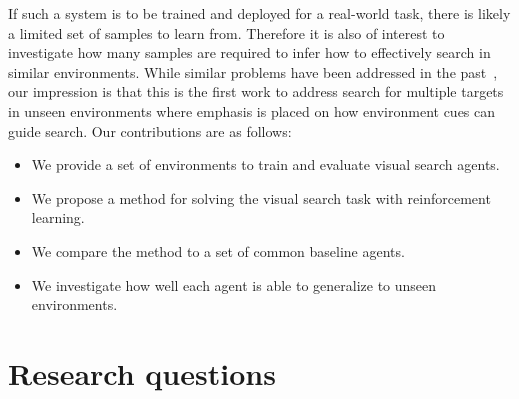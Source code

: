 If such a system is to be trained and deployed for a real-world task, there is likely a limited set of samples to learn from.
Therefore it is also of interest to investigate how many samples are required to infer how to effectively search in similar environments.
While similar problems have been addressed in the past~\cite{minut_mahadevan_2001,mirowski_navigate_2017,ghesu_artificial_2016,caicedo_active_2015}, 
our impression is that this is the first work to address search for multiple targets in unseen environments where emphasis is placed on how environment cues can guide search.
Our contributions are as follows:

\begin{itemize}
  \item We provide a set of environments to train and evaluate visual search agents.
  \item We propose a method for solving the visual search task with reinforcement learning.
  \item We compare the method to a set of common baseline agents.
  \item We investigate how well each agent is able to generalize to unseen environments.
\end{itemize}

\section{Research questions}
\label{sec:research-questions}

